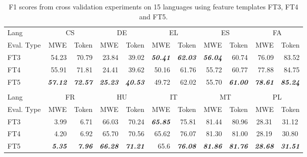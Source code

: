 \documentclass[output=paper,modfonts,nonflat]{langsci/langscibook}
\begin{document}
\begin{table}
\caption{\label{tbl:crf-cv}F1 scores from cross validation experiments on
15 languages using feature templates FT3, FT4 and FT5.}
{
\setlength{\tabcolsep}{0.5pt} %
\small
\begin{tabular}{lrrrrrrrrrr}
\lsptoprule
{Lang} & \multicolumn{2}{c}{{CS}} & \multicolumn{2}{c}{{DE}} & \multicolumn{2}{c}{{EL}} & \multicolumn{2}{c}{{ES}} & \multicolumn{2}{c}{{FA}}\tabularnewline
 
 
{Eval. Type} & {MWE} & {Token} & {MWE} & {Token} & {MWE} & {Token} & {MWE} & {Token} & {MWE} & {Token }\tabularnewline
\midrule
 
{FT3} & {54.23} & {70.79} & {23.84} & {39.02} & \textbf{\emph{50.41}} & \textbf{\emph{62.03}}  & \textbf{\emph{56.04}}  & {60.74} & {76.09} & {83.52 }\tabularnewline
 
{FT4} & {55.91} & {71.81} & {24.41} & {39.62} & {50.16} & {61.76} & {55.72} & {60.77} & {77.88} & {84.75 }\tabularnewline
 
{FT5} & \textbf{\emph{57.12}}  & \textbf{\emph{72.57}}  & \textbf{\emph{25.23}}  & \textbf{\emph{40.53}}  & {49.72} & {62.02} & {55.70} & \textbf{\emph{61.00}}  & \textbf{\emph{78.61}} & \textbf{\emph{85.24}} \tabularnewline
\lspbottomrule
& &&&&&&&&&  \tabularnewline
 
\lsptoprule
{Lang} &  \multicolumn{2}{c}{{FR}} & \multicolumn{2}{c}{{HU}} & \multicolumn{2}{c}{{IT}} & \multicolumn{2}{c}{{MT}} & \multicolumn{2}{c}{{PL}} \tabularnewline
 
 
{Eval. Type} & {MWE} & {Token} & {MWE} & {Token} & {MWE} & {Token} & {MWE} & {Token} & {MWE} & {Token }\tabularnewline
\midrule
 
{FT3} & {3.99} & {6.71} & {66.03} & {70.24} & \textbf{\emph{65.85}} & {75.81} & {81.44} & {80.96} & \multicolumn{1}{c}{{28.31}} & \multicolumn{1}{c}{{31.12}}\tabularnewline
 
{FT4} & {4.20} & {6.92} & {65.70} & {70.56 }& {65.62} & {76.07} & {81.30} & {81.00} & \multicolumn{1}{c}{{28.19}} & \multicolumn{1}{c}{{30.80}}\tabularnewline
 
{FT5} & \textbf{\emph{5.35}}  & \textbf{\emph{7.96}}  & \textbf{\emph{66.28}}  & \textbf{\emph{71.21}} & {65.6} & \textbf{\emph{76.08}} & \textbf{\emph{81.86}}  & \textbf{\emph{81.76}}  & \multicolumn{1}{c}{\textbf{\emph{28.68}}} & \multicolumn{1}{c}{\textbf{\emph{31.51}}}\tabularnewline
 

\end{tabular}}
\end{table}
\end{document}
